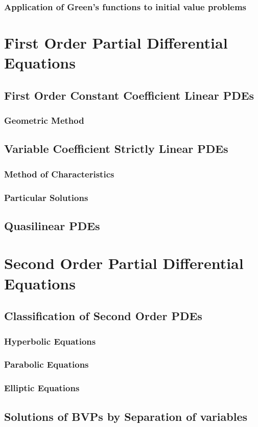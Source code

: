 \documentclass{article}
\theoremstyle{plain}
\theoremstyle{definition}
\numberwithin{equation}{section}
\begin{document}
\subsubsection{Application of Green's functions to initial value problems}

\section{First Order Partial Differential Equations}

\subsection{First Order Constant Coefficient Linear PDEs}

\subsubsection{Geometric Method}

\subsection{Variable Coefficient Strictly Linear PDEs}

\subsubsection{Method of Characteristics}

\subsubsection{Particular Solutions}

\subsection{Quasilinear PDEs}

\section{Second Order Partial Differential Equations}

\subsection{Classification of Second Order PDEs}

\subsubsection{Hyperbolic Equations}

\subsubsection{Parabolic Equations}

\subsubsection{Elliptic Equations}

\subsection{Solutions of BVPs by Separation of variables}
\end{document}
